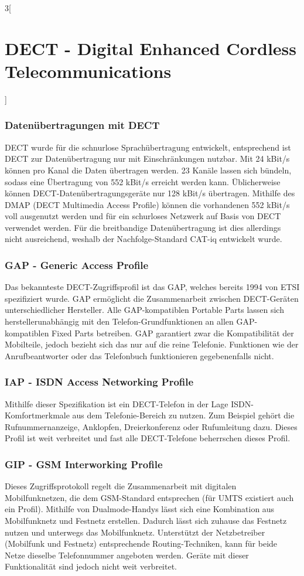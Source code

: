\begin{multicols}{3}[\section{DECT - Digital Enhanced Cordless Telecommunications}]
\subsubsection*{Datenübertragungen mit DECT}
DECT wurde für die schnurlose Sprachübertragung entwickelt, entsprechend ist DECT zur Datenübertragung nur mit Einschränkungen nutzbar. Mit 24 kBit/s können pro Kanal die Daten übertragen werden. 23 Kanäle lassen sich bündeln, sodass eine Übertragung von 552 kBit/s erreicht werden kann. Üblicherweise können DECT-Datenübertragungsgeräte nur 128 kBit/s übertragen. Mithilfe des DMAP (DECT Multimedia Access Profile) können die vorhandenen 552 kBit/s voll ausgenutzt werden und für ein schurloses Netzwerk auf Basis von DECT verwendet werden. Für die breitbandige Datenübertragung ist dies allerdings nicht ausreichend, weshalb der Nachfolge-Standard CAT-iq entwickelt wurde. \cite{dect.1}

\subsubsection*{GAP - Generic Access Profile}
Das bekannteste DECT-Zugriffsprofil ist das GAP, welches bereits 1994 von ETSI spezifiziert wurde. GAP ermöglicht die Zusammenarbeit zwischen DECT-Geräten unterschiedlicher Hersteller. Alle GAP-kompatiblen Portable Parts lassen sich herstellerunabhängig mit den Telefon-Grundfunktionen an allen GAP-kompatiblen Fixed Parts betreiben. GAP garantiert zwar die Kompatibilität der Mobilteile, jedoch bezieht sich das nur auf die reine Telefonie. Funktionen wie der Anrufbeantworter oder das Telefonbuch funktionieren gegebenenfalls nicht. \cite{dect.4,dect.1}

\subsubsection*{IAP - ISDN Access Networking Profile}
Mithilfe dieser Spezifikation ist ein DECT-Telefon in der Lage ISDN-Komfortmerkmale aus dem Telefonie-Bereich zu nutzen. Zum Beispiel gehört die Rufnummernanzeige, Anklopfen, Dreierkonferenz oder Rufumleitung dazu. Dieses Profil ist weit verbreitet und fast alle DECT-Telefone beherrschen dieses Profil. \cite{dect.1}

\subsubsection*{GIP - GSM Interworking Profile}
Dieses Zugriffsprotokoll regelt die Zusammenarbeit mit digitalen Mobilfunknetzen, die dem GSM-Standard entsprechen (für UMTS existiert auch ein Profil). Mithilfe von Dualmode-Handys lässt sich eine Kombination aus Mobilfunknetz und Festnetz erstellen. Dadurch lässt sich zuhause das Festnetz nutzen und unterwegs das Mobilfunknetz. Unterstützt der Netzbetreiber (Mobilfunk und Festnetz) entsprechende Routing-Techniken, kann für beide Netze dieselbe Telefonnummer angeboten werden. Geräte mit dieser Funktionalität sind jedoch nicht weit verbreitet. \cite{dect.1}

\end{multicols}
